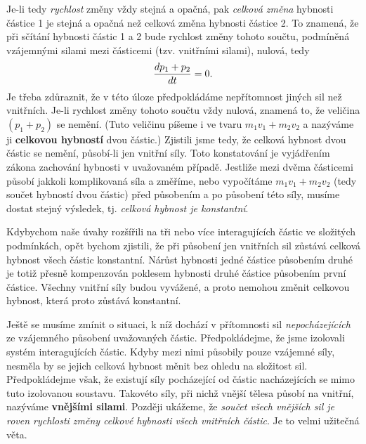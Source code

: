 {    Je-li tedy \emph{rychlost} změny vždy stejná a opačná, pak \emph{celková změna} hybnosti 
    částice 1 je stejná a opačná než celková změna hybnosti částice 2. To znamená, že při sčítání 
    hybnosti částic 1 a 2 bude rychlost změny tohoto součtu, podmíněná vzájemnými silami mezi 
    částicemi (tzv. vnitřními silami), nulová, tedy
    \begin{equation}\label{FYZ:eq137}
      \frac{d p_1+p_2}{d t} = 0.
    \end{equation}
    Je třeba zdůraznit, že v této úloze předpokládáme nepřítomnost jiných sil než vnitřních. Je-li 
    rychlost změny tohoto součtu vždy nulová, znamená to, že veličina \((p_1 + p_2)\) se nemění. 
    (Tuto veličinu píšeme i ve tvaru \(m_1v_1 + m_2v_2\) a nazýváme ji \textbf{celkovou hybností} 
    dvou částic.) Zjistili jsme tedy, že celková hybnost dvou částic se nemění, působí-li jen 
    vnitřní síly. Toto konstatování je vyjádřením zákona zachování hybnosti v uvažovaném případě. 
    Jestliže mezi dvěma částicemi působí jakkoli komplikovaná síla a změříme, nebo vypočítáme 
    \(m_1v_1 + m_2v_2\) (tedy součet hybností dvou částic) před působením a po působení této síly, 
    musíme dostat stejný výsledek, tj. \emph{celková hybnost je konstantní}.
    
    Kdybychom naše úvahy rozšířili na tři nebo více interagujících částic ve složitých podmínkách, 
    opět bychom zjistili, že při působení jen vnitřních sil zůstává celková hybnost všech částic 
    konstantní. Nárůst hybnosti jedné částice působením druhé je totiž přesně kompenzován poklesem 
    hybnosti druhé částice působením první částice. Všechny vnitřní síly budou vyvážené, a proto 
    nemohou změnit celkovou hybnost, která proto zůstává konstantní.
    
    Ještě se musíme zmínit o situaci, k níž dochází v přítomnosti sil \emph{nepocházejících} ze 
    vzájemného působení uvažovaných částic. Předpokládejme, že jsme izolovali systém interagujících 
    částic. Kdyby mezi nimi působily pouze vzájemné síly, nesměla by se jejich celková hybnost 
    měnit bez ohledu na složitost sil. Předpokládejme však, že existují síly pocházející od částic 
    nacházejících se mimo tuto izolovanou soustavu. Takovéto síly, při nichž vnější tělesa působí 
    na vnitřní, nazýváme \textbf{vnějšími silami}. Později ukážeme, že \emph{součet všech vnějších 
    sil je roven rychlosti změny celkové hybnosti všech vnitřních částic}. Je to velmi užitečná 
    věta.
    
}
